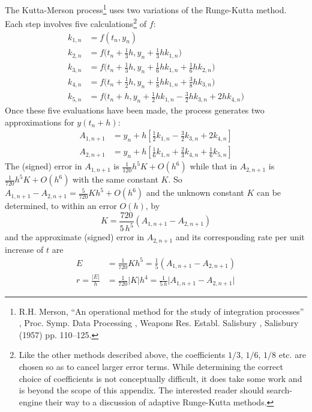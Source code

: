 The Kutta-Merson process\footnote{
R.H. Merson, ``An operational method for the study of integration processes'' , Proc. Symp. Data Processing , Weapons Res. Establ. Salisbury , Salisbury (1957) pp. 110--125.
} uses two variations of 
the Runge-Kutta method. Each step involves five calculations\footnote{Like the other methods described above, the coefficients $1/3$, $1/6$, $1/8$ etc.
are chosen so as to cancel larger error terms. While determining the
correct choice of coefficients is not conceptually difficult, it does take some
work and is beyond the scope of this appendix. The interested reader should
search-engine their way to a discussion of adaptive Runge-Kutta methods.} 
of $f$:
\begin{align*}
k_{1,n}&=f(t_n,y_n) \\
k_{2,n}&=f\big(t_n+\tfrac{1}{3}h,y_n+\tfrac{1}{3}hk_{1,n}\big)\\
k_{3,n}&=
  f\big(t_n+\tfrac{1}{3}h,y_n+\tfrac{1}{6}hk_{1,n}+\tfrac{1}{6}hk_{2,n}\big) \\
k_{4,n}&=
   f\big(t_n+\tfrac{1}{2}h,y_n+\tfrac{1}{8}hk_{1,n}+\tfrac{3}{8}hk_{3,n}\big) \\
k_{5,n}&=
   f\big(t_n+h,y_n+\tfrac{1}{2}hk_{1,n}-\tfrac{3}{2}hk_{3,n}+2hk_{4,n}\big)
\end{align*}
Once these five evaluations have been made, the process generates two
approximations for $y(t_n+h)$:
\begin{align*}
A_{1,n+1}&=y_n+h\left[\tfrac{1}{2}k_{1,n}-\tfrac{3}{2}k_{3,n}+2k_{4,n}\right] \\
A_{2,n+1}&=y_n+h\left[\tfrac{1}{6}k_{1,n}+\tfrac{2}{3}k_{4,n}
                   +\tfrac{1}{6}k_{5,n}\right]
\end{align*}
The (signed) error in $A_{1,n+1}$ is $\frac{1}{120}h^5K+O(h^6)$ while that in
$A_{2,n+1}$ is $\frac{1}{720}h^5K+O(h^6)$ with the same constant $K$. 
So $A_{1,n+1}-A_{2,n+1} = \frac{5}{720}Kh^5+O(h^6)$ and the unknown
constant $K$ can be determined, to within an error $O(h)$, by
\begin{equation*}
K=\frac{720}{5\,h^5}(A_{1,n+1}-A_{2,n+1})
\end{equation*}
and the approximate (signed) error in $A_{2,n+1}$ and its corresponding rate 
per unit increase of $t$ are
\begin{align*}
E&=\frac{1}{720}K h^5=\frac{1}{5}(A_{1,n+1}-A_{2,n+1}) \\
r=\frac{|E|}{h}&=\frac{1}{720}|K| h^4=\frac{1}{5\,h}\big|A_{1,n+1}-A_{2,n+1}\big|
\end{align*}
